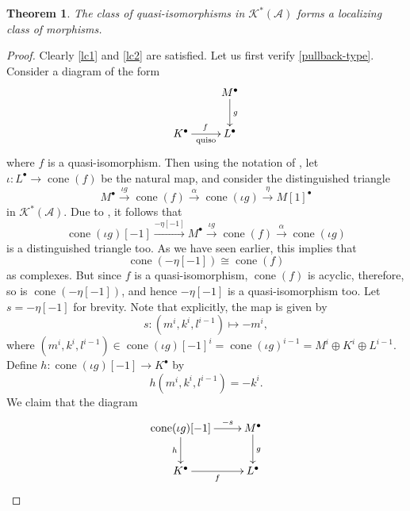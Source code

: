 \documentclass[11pt]{article}
\theoremstyle{thmstyle}
\newtheorem{theorem}{Theorem}[section]
\theoremstyle{defstyle}
\newcommand{\scrA}{\mathscr{A}}
\newcommand{\scrK}{\mathscr{K}}
\newcommand{\cone}{\operatorname{cone}}
\begin{document}
\begin{theorem}
	The class of quasi-isomorphisms in $\scrK^\ast(\scrA)$ forms a localizing class of morphisms.
\end{theorem}
\begin{proof}
	Clearly \ref{lc1} and \ref{lc2} are satisfied. Let us first verify \ref{pullback-type}. Consider a diagram of the form 
	\begin{equation*}
		\xymatrix {
			& M^\bullet\ar[d]^g\\
			K^\bullet\ar[r]^f_-{\rm quiso} & L^\bullet
		}
	\end{equation*}
	where $f$ is a quasi-isomorphism. Then using the notation of , let $\iota\colon L^\bullet\to\cone(f)$ be the natural map, and consider the distinguished triangle 
	\begin{equation*}
		M^\bullet\xrightarrow{\iota g}\cone(f)\xrightarrow{\alpha}\cone(\iota g)\xrightarrow{\eta} M[1]^\bullet
	\end{equation*}
	in $\scrK^\ast(\scrA)$. Due to , it follows that 
	\begin{equation*}
		\cone(\iota g)[-1]\xrightarrow{-\eta[-1]} M^\bullet\xrightarrow{\iota g}\cone(f)\xrightarrow{\alpha}\cone(\iota g)
	\end{equation*}
	is a distinguished triangle too. As we have seen earlier, this implies that 
	\begin{equation*}
		\cone\left(-\eta[-1]\right)\cong\cone(f)
	\end{equation*}
	as complexes. But since $f$ is a quasi-isomorphism, $\cone(f)$ is acyclic, therefore, so is $\cone\left(-\eta[-1]\right)$, and hence $-\eta[-1]$ is a quasi-isomorphism too. Let $s = -\eta[-1]$ for brevity. Note that explicitly, the map is given by 
	\begin{equation*}
		s\colon \left(m^i, k^i, l^{i - 1}\right)\longmapsto -m^i,
	\end{equation*}
	where $\left(m^i, k^i, l^{i - 1}\right)\in \cone(\iota g)[-1]^i = \cone(\iota g)^{i - 1} = M^i\oplus K^i\oplus L^{i - 1}$. Define $h\colon\cone(\iota g)[-1]\to K^\bullet$ by 
	\begin{equation*}
		h\left(m^i, k^i, l^{i - 1}\right) = -k^i.
	\end{equation*}
	We claim that the diagram 
	\begin{equation*}
		\xymatrix {
			\cone(\iota g)[-1]\ar[r]^-{-s}\ar[d]_h & M^\bullet\ar[d]^g\\
			K^\bullet\ar[r]_-f & L^\bullet
		}
	\end{equation*}

\end{proof}
\end{document}

